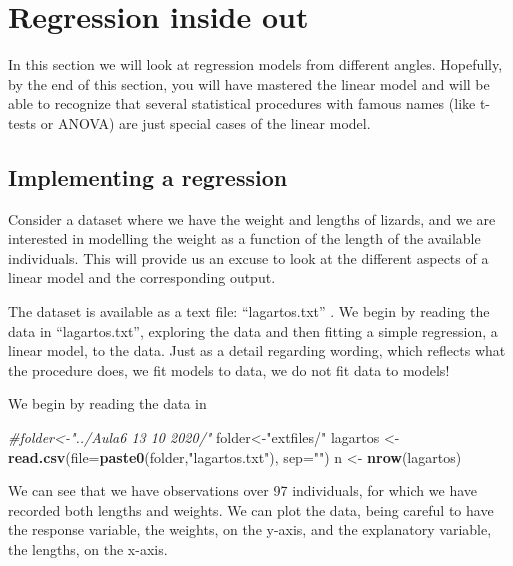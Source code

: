 \documentclass[
]{book}
\newenvironment{Shaded}{\begin{snugshade}}{\end{snugshade}}
\newcommand{\AttributeTok}[1]{\textcolor[rgb]{0.13,0.29,0.53}{#1}}
\newcommand{\CommentTok}[1]{\textcolor[rgb]{0.56,0.35,0.01}{\textit{#1}}}
\newcommand{\FunctionTok}[1]{\textcolor[rgb]{0.13,0.29,0.53}{\textbf{#1}}}
\newcommand{\NormalTok}[1]{#1}
\newcommand{\OtherTok}[1]{\textcolor[rgb]{0.56,0.35,0.01}{#1}}
\newcommand{\StringTok}[1]{\textcolor[rgb]{0.31,0.60,0.02}{#1}}
\begin{document}
\chapter{Regression inside out}\label{RIO}

In this section we will look at regression models from different angles. Hopefully, by the end of this section, you will have mastered the linear model and will be able to recognize that several statistical procedures with famous names (like t-tests or ANOVA) are just special cases of the linear model.

\section{Implementing a regression}\label{implementing-a-regression}

Consider a dataset where we have the weight and lengths of lizards, and we are interested in modelling the weight as a function of the length of the available individuals. This will provide us an excuse to look at the different aspects of a linear model and the corresponding output.

The dataset is available as a text file: ``lagartos.txt'' . We begin by reading the data in ``lagartos.txt'', exploring the data and then fitting a simple regression, a linear model, to the data. Just as a detail regarding wording, which reflects what the procedure does, we fit models to data, we do not fit data to models!

We begin by reading the data in

\begin{Shaded}
\begin{Highlighting}[]
\CommentTok{\#folder\textless{}{-}"../Aula6 13 10 2020/"}
\NormalTok{folder}\OtherTok{\textless{}{-}}\StringTok{"extfiles/"}
\NormalTok{lagartos }\OtherTok{\textless{}{-}} \FunctionTok{read.csv}\NormalTok{(}\AttributeTok{file=}\FunctionTok{paste0}\NormalTok{(folder,}\StringTok{"lagartos.txt"}\NormalTok{), }\AttributeTok{sep=}\StringTok{""}\NormalTok{)}
\NormalTok{n }\OtherTok{\textless{}{-}} \FunctionTok{nrow}\NormalTok{(lagartos)}
\end{Highlighting}
\end{Shaded}

We can see that we have observations over 97 individuals, for which we have recorded both lengths and weights. We can plot the data, being careful to have the response variable, the weights, on the y-axis, and the explanatory variable, the lengths, on the x-axis.
\end{document}

